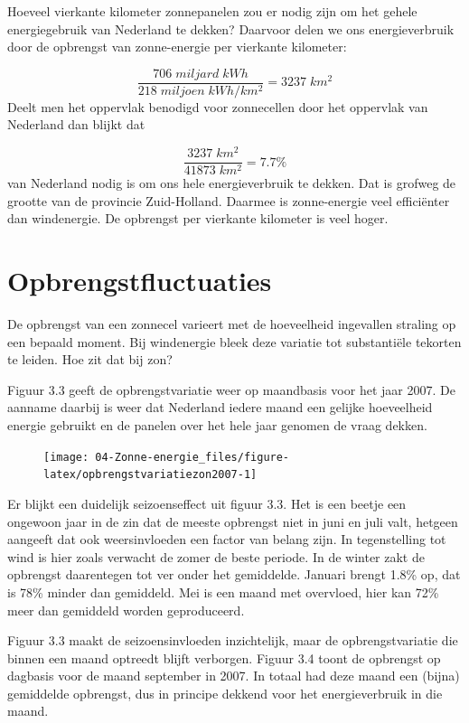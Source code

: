 \documentclass[
  11pt,
  a4paper,
]{book}
\begin{document}
Hoeveel vierkante kilometer zonnepanelen zou er nodig zijn om het gehele energiegebruik van Nederland te dekken? Daarvoor delen we ons energieverbruik door de opbrengst van zonne-energie per vierkante kilometer:

\[ \frac {706\; miljard \; kWh} {218 \; miljoen \; kWh/km^2} = 3237 \; km^2  \]
\noindent
Deelt men het oppervlak benodigd voor zonnecellen door het oppervlak van Nederland dan blijkt dat

\[ \frac {3237 \; km^2} {41873 \; km^2} = 7.7 \% \]
\noindent
van Nederland nodig is om ons hele energieverbruik te dekken. Dat is grofweg de grootte van de provincie Zuid-Holland. Daarmee is zonne-energie veel efficiënter dan windenergie. De opbrengst per vierkante kilometer is veel hoger.

\hypertarget{opbrengstfluctuaties-1}{%
\section{Opbrengstfluctuaties}\label{opbrengstfluctuaties-1}}

De opbrengst van een zonnecel varieert met de hoeveelheid ingevallen straling op een bepaald moment. Bij windenergie bleek deze variatie tot substantiële tekorten te leiden. Hoe zit dat bij zon?

Figuur 3.3 geeft de opbrengstvariatie weer op maandbasis voor het jaar 2007. De aanname daarbij is weer dat Nederland iedere maand een gelijke hoeveelheid energie gebruikt en de panelen over het hele jaar genomen de vraag dekken.

\begin{figure}[t]

{\centering \texttt{[image: 04-Zonne-energie\_files/figure-latex/opbrengstvariatiezon2007-1]} 

}

\end{figure}

Er blijkt een duidelijk seizoenseffect uit figuur 3.3. Het is een beetje een ongewoon jaar in de zin dat de meeste opbrengst niet in juni en juli valt, hetgeen aangeeft dat ook weersinvloeden een factor van belang zijn. In tegenstelling tot wind is hier zoals verwacht de zomer de beste periode. In de winter zakt de opbrengst daarentegen tot ver onder het gemiddelde. Januari brengt 1.8\% op, dat is 78\% minder dan gemiddeld. Mei is een maand met overvloed, hier kan 72\% meer dan gemiddeld worden geproduceerd.

Figuur 3.3 maakt de seizoensinvloeden inzichtelijk, maar de opbrengstvariatie die binnen een maand optreedt blijft verborgen. Figuur 3.4 toont de opbrengst op dagbasis voor de maand september in 2007. In totaal had deze maand een (bijna) gemiddelde opbrengst, dus in principe dekkend voor het energieverbruik in die maand.
\end{document}
